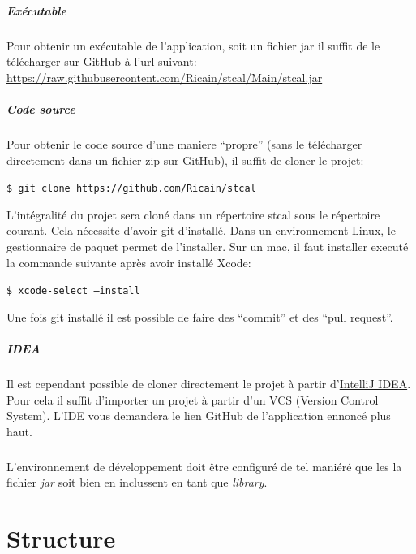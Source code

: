 \documentclass[a4paper,10pt]{report}
\newcommand{\code}[1]{\texttt{#1}}
\begin{document}
			\paragraph[Binaire]{Exécutable}
			Pour obtenir un exécutable de l'application, soit un fichier jar il suffit de le télécharger sur GitHub à l'url suivant: \href{https://raw.githubusercontent.com/Ricain/stcal/Main/stcal.jar}{https://raw.githubusercontent.com/Ricain/stcal/Main/stcal.jar}

			\paragraph[Code source]{Code source}
			Pour obtenir le code source d'une maniere ``propre'' (sans le télécharger directement dans un fichier zip sur GitHub), il suffit de cloner le projet:

			\code{\$ git clone https://github.com/Ricain/stcal}

			L'intégralité du projet sera cloné dans un répertoire stcal sous le répertoire courant. Cela nécessite d'avoir git d'installé. Dans un environnement Linux, le gestionnaire de paquet permet de l'installer. Sur un mac, il faut installer executé la commande suivante après avoir installé Xcode:

			\code{\$ xcode-select --install}

			Une fois git installé il est possible de faire des ``commit'' et des ``pull request''.

			\paragraph[IDEA]{IDEA}
			Il est cependant possible de cloner directement le projet à partir d'\href{http://www.jetbrains.com/idea/}{IntelliJ IDEA}. Pour cela il suffit d'importer un projet à partir d'un VCS (Version Control System). L'IDE vous demandera le lien GitHub de l'application ennoncé plus haut.

			\paragraph*{}
			L’environnement de développement doit être configuré de tel maniéré que les la fichier \textit{jar} soit bien en inclussent en tant que \textit{library}.

\chapter{Structure}
\end{document}
